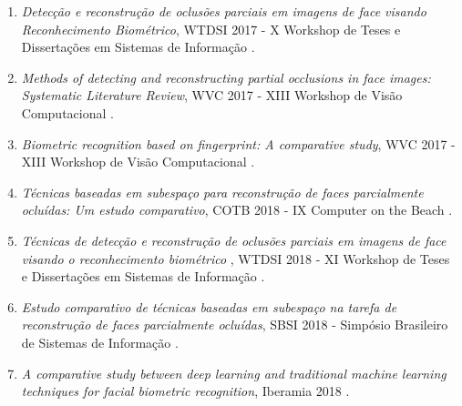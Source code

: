 \begin{enumerate}

\item \textit{Detecção e reconstrução de oclusões parciais em imagens de face visando Reconhecimento Biométrico}, WTDSI 2017 - X Workshop de Teses e Dissertações em Sistemas de Informação \cite{Targino2017_wtdsi}.

\item \textit{Methods of detecting and reconstructing partial occlusions in face images: Systematic Literature Review}, WVC 2017 - XIII Workshop de Visão Computacional \cite{Targino2018_wvc}.

\item \textit{Biometric recognition based on fingerprint: A comparative study}, WVC 2017 - XIII Workshop de Visão Computacional \cite{Targino2018_wvc_duru}.

\item \textit{Técnicas baseadas em subespaço para reconstrução de faces parcialmente ocluídas: Um estudo comparativo}, COTB 2018 - IX Computer on the Beach \cite{Targino2018_cob}.

\item \textit{Técnicas de detecção e reconstrução de oclusões parciais
em imagens de face visando o reconhecimento biométrico
}, WTDSI 2018 - XI Workshop de Teses e Dissertações em Sistemas de Informação \cite{Targino2018_wtdsi}.

\item \textit{Estudo comparativo de técnicas baseadas em subespaço
na tarefa de reconstrução de faces parcialmente ocluídas}, SBSI 2018 - Simpósio Brasileiro de Sistemas de Informação  \cite{Targino2018_sbsi}.

\item \textit{A comparative study between deep learning and traditional machine learning techniques for facial biometric recognition}, Iberamia 2018 \cite{Targino2018_iberamia}.

\end{enumerate}
